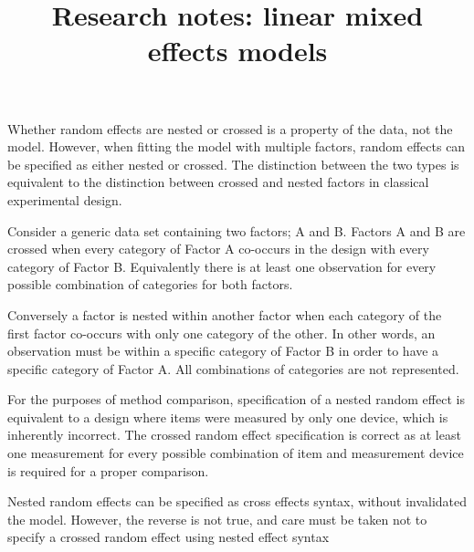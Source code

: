 \documentclass[12pt, a4paper]{report}
\title{Research notes: linear mixed effects models}
\author{ } \date{ }
\theoremstyle{plain}
\theoremstyle{definition}
\theoremstyle{remark}
\begin{document}
Whether random effects are nested or crossed is a property of the data, not the model. However, when fitting the model with multiple factors, random effects can be specified as either nested or crossed. The distinction between the two types is equivalent to the distinction between crossed and nested factors in classical experimental design.

Consider a generic data set containing two factors; A and B. Factors A and B are crossed when every category of Factor A co-occurs in the design with every category of Factor B. Equivalently there is at least one observation for every possible combination of categories for both factors.

Conversely a factor is nested within another factor when each category of the first factor co-occurs with only one category of the other. In other words, an observation must be within a specific category of Factor B in order to have a specific category of Factor A. All combinations of categories are not represented.


For the purposes of method comparison, specification of a nested random effect is equivalent to a design where items were measured by only one device, which is 
inherently incorrect. The crossed random effect  specification is correct as at least one measurement for every possible combination of item and measurement device is required for a proper comparison.


Nested random effects can be specified as cross effects syntax, without invalidated the model. However, the reverse is not true, and care must be taken not to specify a crossed random effect using nested effect syntax

\end{document}
